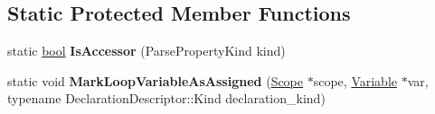 \subsection*{Static Protected Member Functions}
\begin{DoxyCompactItemize}
\item 
\mbox{\label{classv8_1_1internal_1_1ParserBase_a4600630ce38e9d8db1e381ea8e47074b}} 
static \mbox{\hyperlink{classbool}{bool}} {\bfseries Is\+Accessor} (Parse\+Property\+Kind kind)
\item 
\mbox{\label{classv8_1_1internal_1_1ParserBase_ae40dce2394471859a4643af7d2c946fa}} 
static void {\bfseries Mark\+Loop\+Variable\+As\+Assigned} (\mbox{\hyperlink{classv8_1_1internal_1_1Scope}{Scope}} $\ast$scope, \mbox{\hyperlink{classv8_1_1internal_1_1Variable}{Variable}} $\ast$var, typename Declaration\+Descriptor\+::\+Kind declaration\+\_\+kind)
\end{DoxyCompactItemize}
